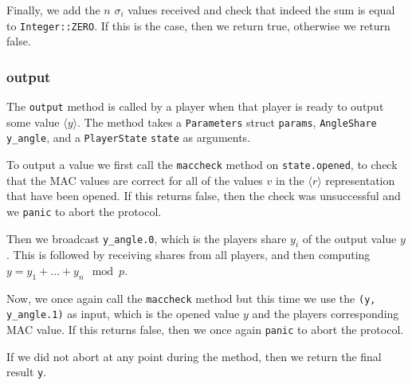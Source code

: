 \documentclass[../main.tex]{subfiles}
\begin{document}
Finally, we add the $n$ $\sigma_i$ values received and check that indeed the sum is equal to \lstinline{Integer::ZERO}. If this is the case, then we return true, otherwise we return false.

\subsubsection{output}
The \lstinline{output} method is called by a player when that player is ready to output some value $\langle y \rangle$. The method takes a \lstinline{Parameters} struct \lstinline{params}, \lstinline{AngleShare} \lstinline{y_angle}, and a \lstinline{PlayerState} \lstinline{state} as arguments.

To output a value we first call the \lstinline{maccheck} method on \lstinline{state.opened}, to check that the MAC values are correct for all of the values $v$ in the $\langle r \rangle$ representation that have been opened. If this returns false, then the check was unsuccessful and we \lstinline{panic} to abort the protocol.

Then we broadcast \lstinline{y_angle.0}, which is the players share $y_i$ of the output value $y$. This is followed by receiving shares from all players, and then computing $y = y_1 + ... + y_n \mod p$.

Now, we once again call the \lstinline{maccheck} method but this time we use the \lstinline{(y, y_angle.1)} as input, which is the opened value $y$ and the players corresponding MAC value. If this returns false, then we once again \lstinline{panic} to abort the protocol.

If we did not abort at any point during the method, then we return the final result \lstinline{y}.
\end{document}
